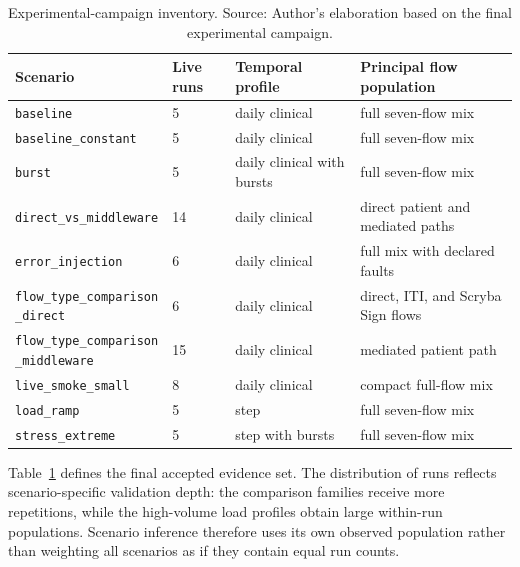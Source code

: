 \begin{table}[H]
    \centering
    \caption[Experimental-campaign inventory]{Experimental-campaign inventory. Source: Author's elaboration based on the final experimental campaign.}
    \scriptsize
    \setlength{\tabcolsep}{4pt}
    \begin{tabular}{|p{3.4cm}|p{1.0cm}|p{3.4cm}|p{5.1cm}|}
        \hline
        \rowcolor{veryPeri!18}
        \textbf{Scenario} & \textbf{Live runs} & \textbf{Temporal profile} & \textbf{Principal flow population} \\
        \hline
        \rowcolor{tableGray}
        \texttt{baseline} & 5 & daily clinical & full seven-flow mix \\
        \hline
        \texttt{baseline\_constant} & 5 & daily clinical & full seven-flow mix \\
        \hline
        \rowcolor{tableGray}
        \texttt{burst} & 5 & daily clinical with bursts & full seven-flow mix \\
        \hline
        \texttt{direct\_vs\_middleware} & 14 & daily clinical & direct patient and mediated paths \\
        \hline
        \rowcolor{tableGray}
        \texttt{error\_injection} & 6 & daily clinical & full mix with declared faults \\
        \hline
        \shortstack[l]{\texttt{flow\_type\_comparison}\\\texttt{\_direct}} & 6 & daily clinical & direct, ITI, and Scryba Sign flows \\
        \hline
        \rowcolor{tableGray}
        \shortstack[l]{\texttt{flow\_type\_comparison}\\\texttt{\_middleware}} & 15 & daily clinical & mediated patient path \\
        \hline
        \texttt{live\_smoke\_small} & 8 & daily clinical & compact full-flow mix \\
        \hline
        \rowcolor{tableGray}
        \texttt{load\_ramp} & 5 & step & full seven-flow mix \\
        \hline
        \texttt{stress\_extreme} & 5 & step with bursts & full seven-flow mix \\
        \hline
    \end{tabular}
    \label{tab:final-rdg-campaign}
\end{table}

\noindent Table~\ref{tab:final-rdg-campaign} defines the final accepted evidence set.
The distribution of runs reflects scenario-specific validation depth: the
comparison families receive more repetitions, while the high-volume load
profiles obtain large within-run populations. Scenario inference therefore uses
its own observed population rather than weighting all scenarios as if they
contain equal run counts.


